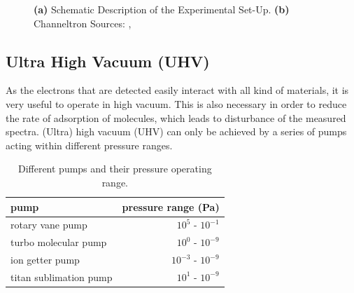 \documentclass[a4paper]{scrartcl}
\numberwithin{equation}{section}
\numberwithin{figure}{section}
\numberwithin{table}{section}
\begin{document}
\begin{figure} 
 \centering
 \hfill

\caption{ \small \textbf{(a)} Schematic Description of the Experimental Set-Up. \textbf{(b)} Channeltron Sources: \cite{script}, \cite{gop} } 
	\label{fig:setup}
\end{figure}


\subsection{Ultra High Vacuum (UHV)}
As the electrons that are detected easily interact with all kind of materials, it is very useful to operate in high vacuum. This is also necessary in order to reduce the rate of adsorption of molecules, which leads to disturbance of the measured spectra. (Ultra) high  vacuum (UHV) can only be achieved by a series of pumps acting within different pressure ranges.
\begin{table}
\begin{tabular}{lr}
\toprule
pump & pressure range (Pa)\\
\midrule
\small rotary vane pump & $10^5$ - $10^{-1}$  \\ 
\small turbo molecular pump &  $10^0$  - $10^{-9}$  \\
\small ion getter pump  & $ 10^{-3}$  - $10^{-9}$  \\
\small titan sublimation pump & $10^1$  - $10^{-9}$  \\
\bottomrule
\end{tabular}
\caption{Different pumps and their pressure operating range. \cite{gop} }
\label{tab:pump}
\end{table}
\end{document}
